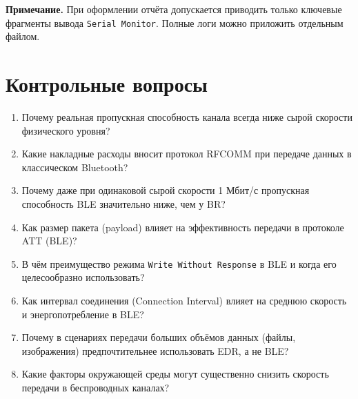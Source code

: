 \textbf{Примечание.} При оформлении отчёта допускается приводить только ключевые фрагменты вывода \texttt{Serial Monitor}. Полные логи можно приложить отдельным файлом.

\section*{Контрольные вопросы}
\begin{enumerate}[nosep, leftmargin=*]
    \item Почему реальная пропускная способность канала всегда ниже сырой скорости физического уровня?
    \item Какие накладные расходы вносит протокол RFCOMM при передаче данных в классическом Bluetooth?
    \item Почему даже при одинаковой сырой скорости 1 Мбит/с пропускная способность BLE значительно ниже, чем у BR?
    \item Как размер пакета (payload) влияет на эффективность передачи в протоколе ATT (BLE)?
    \item В чём преимущество режима \texttt{Write Without Response} в BLE и когда его целесообразно использовать?
    \item Как интервал соединения (Connection Interval) влияет на среднюю скорость и энергопотребление в BLE?
    \item Почему в сценариях передачи больших объёмов данных (файлы, изображения) предпочтительнее использовать EDR, а не BLE?
    \item Какие факторы окружающей среды могут существенно снизить скорость передачи в беспроводных каналах?
\end{enumerate}
